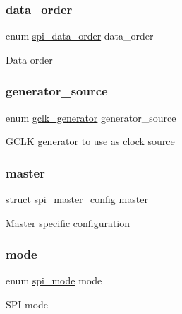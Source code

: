 \subsubsection{\texorpdfstring{data\_order}{data\_order}}
{\footnotesize\ttfamily enum \mbox{\hyperlink{group__asfdoc__sam0__sercom__spi__group_gabaa69dbc0601cb5b1e2681400598a4b2}{spi\+\_\+data\+\_\+order}} data\+\_\+order}

Data order \mbox{\label{structspi__config_a2dba667c6d06bff254b7284d45dd02a3}} 
\subsubsection{\texorpdfstring{generator\_source}{generator\_source}}
{\footnotesize\ttfamily enum \mbox{\hyperlink{group__asfdoc__sam0__system__clock__group_ga1ab9bb87560ad127ed982591b7d67311}{gclk\+\_\+generator}} generator\+\_\+source}

G\+C\+LK generator to use as clock source \mbox{\label{structspi__config_a03ce4a83f9312e08f9ec6bff0dfdbf28}} 
\subsubsection{\texorpdfstring{master}{master}}
{\footnotesize\ttfamily struct \mbox{\hyperlink{structspi__master__config}{spi\+\_\+master\+\_\+config}} master}

Master specific configuration \mbox{\label{structspi__config_aa56044693231ac71d809d1c28e94800a}} 
\subsubsection{\texorpdfstring{mode}{mode}}
{\footnotesize\ttfamily enum \mbox{\hyperlink{group__asfdoc__sam0__sercom__spi__group_ga78c1313670220bedfecdb138d4c27903}{spi\+\_\+mode}} mode}

S\+PI mode \mbox{\label{structspi__config_a0f7ed07442eb6f29d7188434c1c5e177}} 
